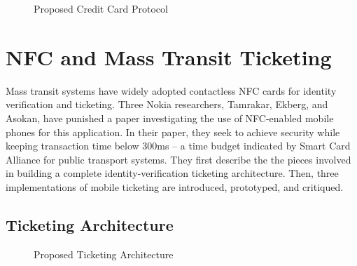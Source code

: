 \documentclass{sig-alternate}
\begin{document}

\begin{figure}
\centering
{}
\caption{Proposed Credit Card Protocol~\cite{CC2016}}
\label{fig:secureCC}
\end{figure}



\section{NFC and Mass Transit Ticketing}
\label{sec:mobile}

Mass transit systems have widely adopted contactless NFC cards for identity verification and ticketing. Three Nokia researchers, Tamrakar, Ekberg, and Asokan, have punished a paper investigating the use of NFC-enabled mobile phones for this application. In their paper, they seek to achieve security while keeping transaction time below 300ms -- a time budget indicated by Smart Card Alliance for public transport systems.
They first describe the the pieces involved in building a complete identity-verification ticketing architecture. Then, three implementations of mobile ticketing are introduced, prototyped, and critiqued.~\cite{Ticket2011}

\subsection{Ticketing Architecture}
\begin{figure}
\centering
{}
\caption{Proposed Ticketing Architecture~\cite{Ticket2011}}
\label{fig:ticketingArch}
\end{figure}
\end{document}
